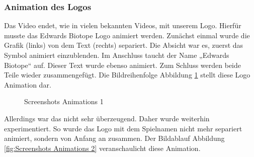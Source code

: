 \subsubsection{Animation des Logos}
Das Video endet, wie in vielen bekannten Videos, mit unserem Logo. Hierfür musste das Edwards Biotope Logo animiert werden. 
Zunächst einmal wurde die Grafik (links) von dem Text (rechts) separiert. Die Absicht war es, zuerst das Symbol animiert einzublenden. Im Anschluss taucht der Name „Edwards Biotope“ auf. Dieser Text wurde ebenso animiert. Zum Schluss werden beide Teile wieder zusammengefügt. Die Bildreihenfolge Abbildung \ref{fig:Screenshots Animations 1} stellt diese Logo Animation dar. 
\begin{figure}[h]
\centering
\qquad
\qquad
\qquad
\caption{Screenshots Animations 1}%
 \label{fig:Screenshots Animations 1}%
\end{figure}

Allerdings war das nicht sehr überzeugend. Daher wurde weiterhin experimentiert. So wurde das Logo mit dem Spielnamen nicht mehr separiert animiert, sondern von Anfang an zusammen. Der Bildablauf  Abbildung \ref{fig:Screenshots Animations 2} veranschaulicht diese Animation.

